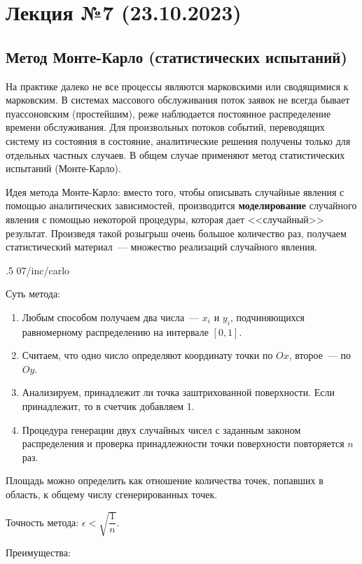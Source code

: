 \section{Лекция №7 (23.10.2023)}

\subsection{Метод Монте-Карло (статистических испытаний)}

На практике далеко не все процессы являются марковскими или сводящимися к марковским. В системах массового обслуживания поток заявок не всегда бывает пуассоновским (простейшим), реже наблюдается постоянное распределение времени обслуживания. Для произвольных потоков событий, переводящих систему из состояния в состояние, аналитические решения получены только для отдельных частных случаев. В общем случае применяют метод статистических испытаний (Монте-Карло).

Идея метода Монте-Карло: вместо того, чтобы описывать случайные явления с помощью аналитических зависимостей, производится \textbf{моделирование} случайного явления с помощью некоторой процедуры, которая дает <<случайный>> результат. Произведя такой розыгрыш очень большое количество раз, получаем статистический материал~--- множество реализаций случайного явления.

\image
{.5\textwidth}
{07/inc/carlo}
{}

Суть метода:

\begin{enumerate}
    \item Любым способом получаем два числа~--- $x_i$ и $y_i$, подчиняющихся равномерному распределению на интервале $[0, 1]$.
    \item Считаем, что одно число определяют координату точки по $Ox$, второе~--- по $Oy$.
    \item Анализируем, принадлежит ли точка заштрихованной поверхности. Если принадлежит, то в счетчик добавляем 1.
    \item Процедура генерации двух случайных чисел с заданным законом распределения и проверка принадлежности точки поверхности повторяется $n$ раз.
\end{enumerate}

Площадь можно определить как отношение количества точек, попавших в область, к общему числу сгенерированных точек.

Точность метода: ${\epsilon < \sqrt{\dfrac{1}{n}}}$.

Преимущества:

